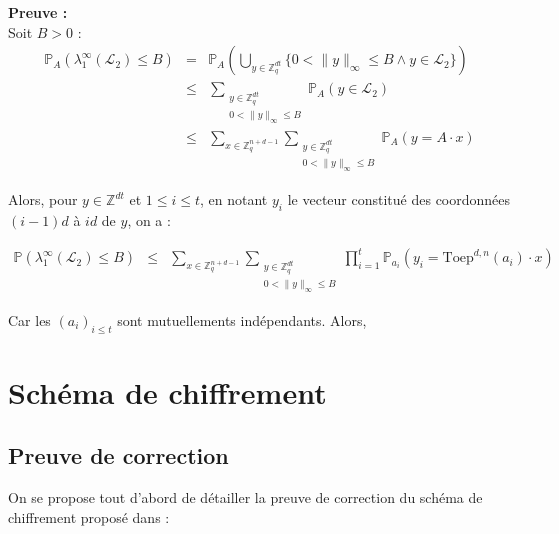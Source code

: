 \documentclass[11pt,a4paper]{article}
\begin{document}
\textbf{Preuve :} \\
Soit $B >0$ :
\begin{eqnarray*}
\mathbb{P}_A(\lambda_1^\infty(\mathcal{L}_2) \leq B) &=& \mathbb{P}_A( \bigcup_{y\in \mathbb{Z}_q^{dt}} \{0 < \|y\|_\infty \leq B \land y \in \mathcal{L}_2 \} ) \\
&\leq& \sum_{\substack{y \in \mathbb{Z}_q^{dt} \\ 0 < \|y\|_\infty \leq B}} \mathbb{P}_A(y \in \mathcal{L}_2) \\
&\leq&  \sum_{x \in \mathbb{Z}_q^{n+d-1}} \sum_{\substack{y \in \mathbb{Z}_q^{dt} \\ 0 < \|y\|_\infty \leq B}} \mathbb{P}_A(y=A\cdot x) 
\end{eqnarray*}

Alors, pour $y \in \mathbb{Z}^{dt}$ et $1 \leq i \leq t$, en notant $y_i$ le vecteur constitué des coordonnées $(i-1)d$ à $id$ de $y$, on a : 

\begin{eqnarray*}
\mathbb{P}(\lambda_1^\infty(\mathcal{L}_2) \leq B) &\leq& \sum_{x \in \mathbb{Z}_q^{n+d-1}} \sum_{\substack{y \in \mathbb{Z}_q^{dt} \\ 0 < \|y\|_\infty \leq B}} \prod_{i=1}^t \mathbb{P}_{a_i}(y_i =\text{Toep}^{d,n}(a_i) \cdot  x)
\end{eqnarray*}

Car les $(a_i)_{i\leq t}$ sont mutuellements indépendants. Alors, 

\section{Schéma de chiffrement}

\subsection{Preuve de correction}
On se propose tout d'abord de détailler la preuve de correction du schéma de chiffrement proposé dans \cite{mplwe} : \\
\end{document}
